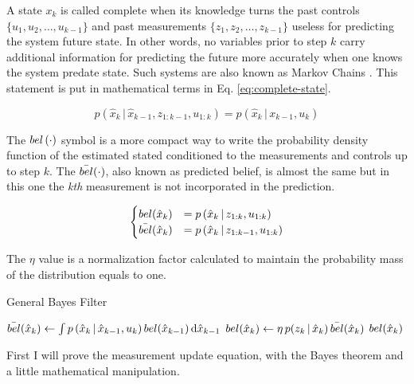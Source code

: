 \documentclass[12pt]{article}
\begin{document}
A state $x_k$ is called complete when its knowledge turns the past controls $\{u_1, u_2, \dots, u_{k-1}\}$ and past measurements $\{z_1, z_2, \dots, z_{k-1}\}$ useless for predicting the system future state. In other words, no variables prior to step $k$ carry additional information for predicting the future more accurately when one knows the system predate state. Such systems are also known as Markov Chains \cite[p.~21]{bongard2006probabilistic}. This statement is put in mathematical terms in Eq. \ref{eq:complete-state}.

\begin{equation}
p(\hat{x}_k \,|\, \hat{x}_{k-1}, z_{1:k-1}, u_{1:k}) = p(\hat{x}_k \,|\, x_{k-1}, u_k)
\label{eq:complete-state}
\end{equation}

The $\mathop{bel}\left(\cdot\right)$ symbol is a more compact way to write the probability density function of the estimated stated conditioned to the measurements and controls up to step $k$. The $\bar{\mathop{bel}}(\cdot)$, also known as predicted belief, is almost the same but in this one the \textit{kth} measurement is not incorporated in the prediction.

\begin{equation}
\begin{cases}
    \mathop{bel}(\hat{x}_k) &= p\left(\hat{x}_k \,|\, z_{1:k}, u_{1:k}\right)\\
    \bar{\mathop{bel}}(\hat{x}_k) &= p\left(\hat{x}_k \,|\, z_{1:k-1}, u_{1:k}\right)
\end{cases}
\label{eq:belief}
\end{equation}

The $\eta$ value is a normalization factor calculated to maintain the probability mass of the distribution equals to one.

\begin{algorithm}[h]
\caption{General Bayes Filter}
\label{alg:general-bayes-filter}
\begin{algorithmic}[1]
\State $\bar{\mathop{bel}}(\hat{x}_k) \gets \int{p\left(\hat{x}_k \,|\, \hat{x}_{k-1}, u_k) \mathop{bel}(\hat{x}_{k-1}\right) } \dd{\hat{x}_{k-1}}$ 
\State $\mathop{bel}(\hat{x}_k) \gets \eta \, p(z_k \,|\, \hat{x}_k) \,\bar{\mathop{bel}}(\hat{x}_k)$ 
\State \Return $\mathop{bel}(\hat{x}_k)$
\EndProcedure
\end{algorithmic}
\end{algorithm}

First I will prove the measurement update equation, with the Bayes theorem and a little mathematical manipulation.
\end{document}
